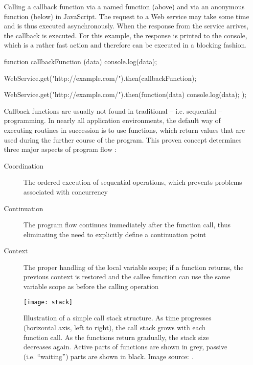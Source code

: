 \begin{program}
  \caption{Calling a callback function via a named function (above) and via an anonymous function (below) in JavaScript. The request to a Web service may take some time and is thus executed asynchronously. When the response from the service arrives, the callback is executed. For this example, the response is printed to the console, which is a rather fast action and therefore can be executed in a blocking fashion.}
  \label{prog:callback}
  \begin{JavaCode}
function callbackFunction (data) {
    console.log(data);
}
  
WebService.get("http://example.com/").then(callbackFunction);
  \end{JavaCode}
\begin{JavaCode}
WebService.get("http://example.com/").then(function(data) {
    console.log(data);
});
  \end{JavaCode}
\end{program}

Callback functions are usually not found in traditional -- i.e. sequential -- programming. In nearly all application environments, the default way of executing routines in succession is to use functions, which return values that are used during the further course of the program. This proven concept determines three major aspects of program flow \cite[p. 3]{Hohpe2006}:

\begin{description}
  \item[Coordination] The ordered execution of sequential operations, which prevents problems associated with concurrency
  \item[Continuation] The program flow continues immediately after the function call, thus eliminating the need to explicitly define a continuation point
  \item[Context] The proper handling of the local variable scope; if a function returns, the previous context is restored and the callee function can use the same variable scope as before the calling operation  
\end{description}

\begin{figure}
\centering\small
\setlength{\tabcolsep}{0mm}
  \texttt{[image: stack]}
\caption{
Illustration of a simple call stack structure. As time progresses (horizontal axis, left to right), the call stack grows with each function call. As the functions return gradually, the stack size decreases again. Active parts of functions are shown in grey, passive (i.e. ``waiting'') parts are shown in black. Image source: \cite{Hohpe2006}.
}
\label{fig:stack}
\end{figure}

